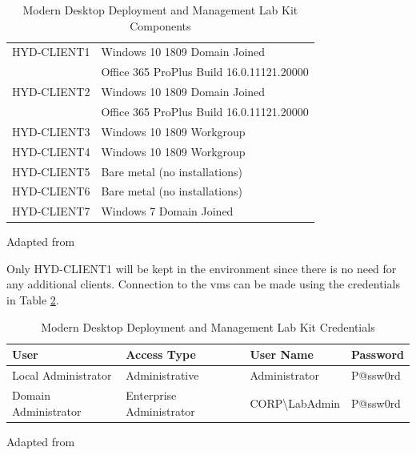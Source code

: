 \begin{table}[ht]
\begin{adjustbox}{width=1\textwidth}
\begin{tabular}{l|l}
			HYD-CLIENT1  & Windows 10 1809 Domain Joined                                  					      \\
			& Office 365 ProPlus Build 16.0.11121.20000                         								   \\
			HYD-CLIENT2  & Windows 10 1809 Domain Joined                                     					    \\
			& Office 365 ProPlus Build 16.0.11121.20000                           									 \\
			HYD-CLIENT3  & Windows 10 1809 Workgroup                                         						  \\
			HYD-CLIENT4  & Windows 10 1809 Workgroup                                          						   \\
			HYD-CLIENT5 & Bare metal (no installations)                                      						    \\
			HYD-CLIENT6 & Bare metal (no installations)                                       							 \\
			HYD-CLIENT7  & Windows 7 Domain Joined                                            
		\end{tabular}
	\end{adjustbox}
	\caption[Lab kit components]{Modern Desktop Deployment and Management Lab Kit Components}
	\scriptsize	
	Adapted from \cite{MicrosoftCorporation2019}
	\label{tab:LKC}
\end{table}


Only HYD-CLIENT1 will be kept in the environment since there is no need for any additional clients. 
Connection to the \acrshort{vm}s can be made using the credentials in Table \ref{tab:LKCred}.

\begin{table}[ht]
	\centering
	\begin{adjustbox}{width=1\textwidth}
		\begin{tabular}{l|lll}
			User                 & Access Type              & User Name                    & Password \\
			\hline
			Local Administrator  & Administrative           & Administrator                & P@ssw0rd \\
			Domain Administrator & Enterprise Administrator & CORP\textbackslash{}LabAdmin & P@ssw0rd
		\end{tabular}
	\end{adjustbox}
	\caption[Lab kit credentials]{Modern Desktop Deployment and Management Lab Kit Credentials}
	\scriptsize	
	Adapted from \cite{MicrosoftCorporation2019}
	\label{tab:LKCred}
\end{table}

